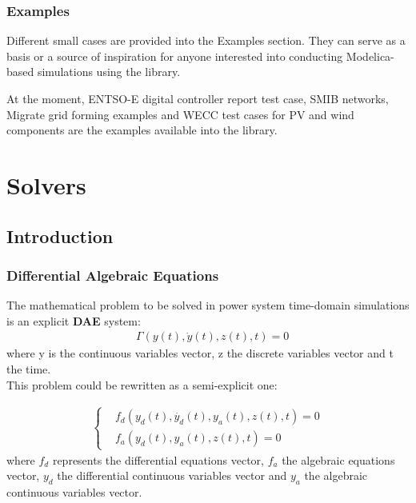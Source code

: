 \documentclass[a4paper, 12pt]{report}
\begin{document}
\subsubsection{Examples}

Different small cases are provided into the Examples section. They can serve as a basis or a source of inspiration for anyone interested into conducting Modelica-based simulations using the \Dynawo library.

At the moment, ENTSO-E digital controller report test case, SMIB networks, Migrate grid forming examples and \ac{WECC} test cases for PV and wind components are the examples available into the library.

\section{Solvers}

\subsection{Introduction}
\label{sec:Solver Introduction}

\subsubsection{Differential Algebraic Equations}

The mathematical problem to be solved in power system time-domain simulations is an explicit \textbf{\ac{DAE}} system:\\
\begin{equation}
\begin{aligned}
& \Gamma(y(t), \dot{y}(t), z(t), t) = 0
\end{aligned}
\label{DAE}
\end{equation}
where y is the continuous variables vector, z the discrete variables vector and t the time. \\

This problem could be rewritten as a semi-explicit one:

\begin{equation}
\begin{aligned}
\begin{cases}
& f_d(y_d(t), \dot{y_d}(t), y_a(t), z(t), t) = 0 \\
& f_a(y_d(t), y_a(t), z(t), t) = 0
\end{cases}
\end{aligned}
\end{equation}
where $f_d$ represents the differential equations vector, $f_a$ the algebraic equations vector, $y_d$ the differential continuous variables vector and $y_a$ the algebraic continuous variables vector. \\
\end{document}
